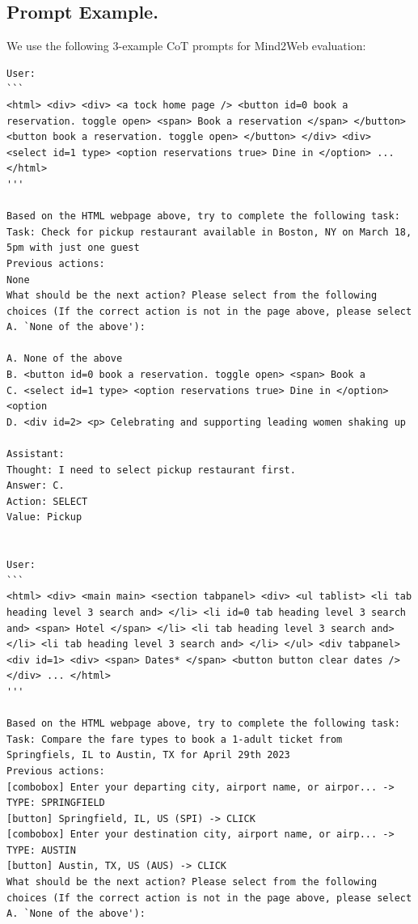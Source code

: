 \subsection{Prompt Example.}
We use the following 3-example CoT prompts for Mind2Web evaluation:
\begin{lstlisting}
User:
```
<html> <div> <div> <a tock home page /> <button id=0 book a reservation. toggle open> <span> Book a reservation </span> </button> <button book a reservation. toggle open> </button> </div> <div> <select id=1 type> <option reservations true> Dine in </option> ... </html>
'''

Based on the HTML webpage above, try to complete the following task:
Task: Check for pickup restaurant available in Boston, NY on March 18, 5pm with just one guest
Previous actions:
None
What should be the next action? Please select from the following choices (If the correct action is not in the page above, please select A. `None of the above'):

A. None of the above
B. <button id=0 book a reservation. toggle open> <span> Book a
C. <select id=1 type> <option reservations true> Dine in </option> <option
D. <div id=2> <p> Celebrating and supporting leading women shaking up

Assistant:
Thought: I need to select pickup restaurant first.
Answer: C.
Action: SELECT
Value: Pickup


User:
```
<html> <div> <main main> <section tabpanel> <div> <ul tablist> <li tab heading level 3 search and> </li> <li id=0 tab heading level 3 search and> <span> Hotel </span> </li> <li tab heading level 3 search and> </li> <li tab heading level 3 search and> </li> </ul> <div tabpanel> <div id=1> <div> <span> Dates* </span> <button button clear dates /> </div> ... </html>
'''

Based on the HTML webpage above, try to complete the following task:
Task: Compare the fare types to book a 1-adult ticket from Springfiels, IL to Austin, TX for April 29th 2023
Previous actions:
[combobox] Enter your departing city, airport name, or airpor... -> TYPE: SPRINGFIELD
[button] Springfield, IL, US (SPI) -> CLICK
[combobox] Enter your destination city, airport name, or airp... -> TYPE: AUSTIN
[button] Austin, TX, US (AUS) -> CLICK
What should be the next action? Please select from the following choices (If the correct action is not in the page above, please select A. `None of the above'):


\end{lstlisting}
